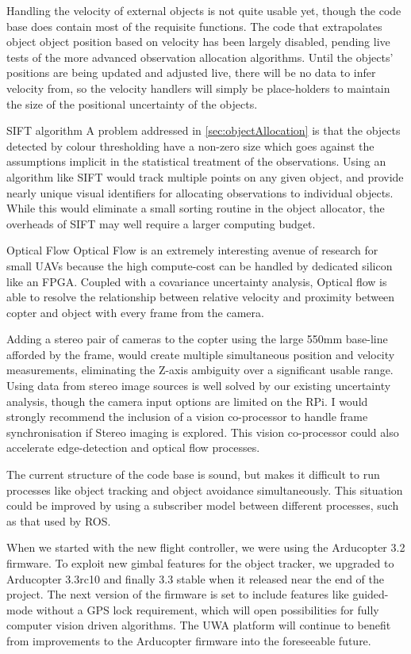 \documentclass[a4paper, 11pt, titlepage]{article}
\begin{document}
  Handling the velocity of external objects is not quite usable yet, though the code base does contain most of the requisite functions.  The code that extrapolates object object position based on velocity has been largely disabled, pending live tests of the more advanced observation allocation algorithms.  Until the objects' positions are being updated and adjusted live, there will be no data to infer velocity from, so the velocity handlers will simply be place-holders to maintain the size of the positional uncertainty of the objects.

  SIFT algorithm
  A problem addressed in \ref{sec:objectAllocation} is that the objects detected by colour thresholding have a non-zero size which goes against the assumptions implicit in the statistical treatment of the observations.  Using an algorithm like SIFT would track multiple points on any given object, and provide nearly unique visual identifiers for allocating observations to individual objects.  While this would eliminate a small sorting routine in the object allocator, the overheads of SIFT may well require a larger computing budget.

  Optical Flow
  Optical Flow is an extremely interesting avenue of research for small UAVs because the high compute-cost can be handled by dedicated silicon like an FPGA.  Coupled with a covariance uncertainty analysis, Optical flow is able to resolve the relationship between relative velocity and proximity between copter and object with every frame from the camera.  

  Adding a stereo pair of cameras to the copter using the large 550mm base-line afforded by the frame, would create multiple simultaneous position and velocity measurements, eliminating the Z-axis ambiguity over a significant usable range.  
  Using data from stereo image sources is well solved by our existing uncertainty analysis, though the camera input options are limited on the RPi. I would strongly recommend the inclusion of a vision co-processor to handle frame synchronisation if Stereo imaging is explored.  This vision co-processor could also accelerate edge-detection and optical flow processes.

  The current structure of the code base is sound, but makes it difficult to run processes like object tracking and object avoidance simultaneously.  This situation could be improved by using a subscriber model between different processes, such as that used by ROS.

  When we started with the new flight controller, we were using the Arducopter 3.2 firmware. To exploit new gimbal features for the object tracker, we upgraded to Arducopter 3.3rc10 and finally 3.3 stable when it released near the end of the project.  The next version of the firmware is set to include features like guided-mode without a GPS lock requirement, which will open possibilities for fully computer vision driven algorithms.  The UWA platform will continue to benefit from improvements to the Arducopter firmware into the foreseeable future.
\end{document}
